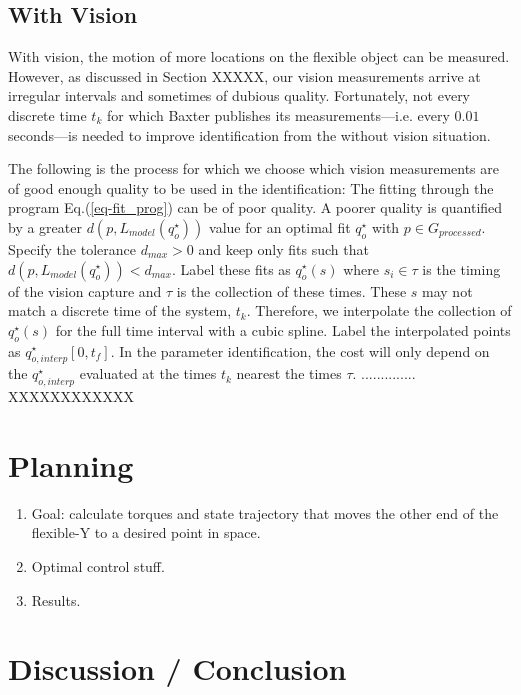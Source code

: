 \documentclass[runningheads,a4paper]{llncs}
\begin{document}
\subsection{With Vision}
With vision, the motion of more locations on the flexible object can be measured. However, as discussed in Section XXXXX, our vision measurements arrive at irregular intervals and sometimes of dubious quality. Fortunately, not every discrete time $t_k$ for which Baxter publishes its measurements---i.e. every $0.01$ seconds---is needed to improve identification from the without vision situation.  

The following is the process for which we choose which vision measurements are of good enough quality to be used in the identification: The fitting through the program Eq.(\ref{eq-fit_prog}) can be of poor quality. A poorer quality is quantified by a greater $d(p,L_{model}(q_o^\star))$ value for an optimal fit $q_o^\star$ with $p\in G_{processed}$. Specify the tolerance $d_{max}>0$ and keep only fits such that $d(p,L_{model}(q_o^\star))<d_{max}$. Label these fits as $q_o^\star(s)$ where $s_i\in\tau$ is the timing of the vision capture and $\tau$ is the collection of these times. These $s$ may not match a discrete time of the system, $t_k$. Therefore, we interpolate the collection of $q_o^\star(s)$ for the full time interval with a cubic spline. Label the interpolated points as $q_{o,interp}^\star[0,t_f]$. In the parameter identification, the cost will only depend on the $q_{o,interp}^\star$ evaluated at the times $t_k$ nearest the times $\tau$. .............. XXXXXXXXXXXX


\section{Planning}
\begin{enumerate}
\item Goal: calculate torques and state trajectory that moves the other end of the flexible-Y to a desired point in space.
\item Optimal control stuff.
\item Results.
\end{enumerate}

\section{Discussion / Conclusion}




\end{document}
